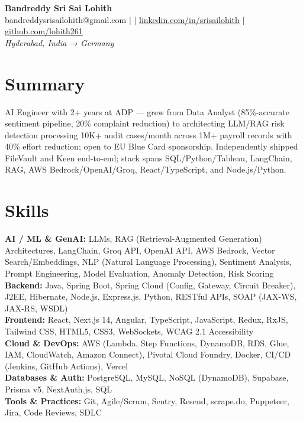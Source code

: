 \documentclass[10pt,letterpaper]{article}
\newcommand{\skillrow}[2]{\textbf{#1:} #2 \\[1pt]}
\begin{document}
\begin{center}
  {\Huge\bfseries Bandreddy Sri Sai Lohith}\\[3pt]
  \small bandreddysrisailohith@gmail.com $\vert$ $\vert$\; \href{https://linkedin.com/in/srisailohith}{linkedin.com/in/srisailohith} $\vert$\; \href{https://github.com/lohith261}{github.com/lohith261} \\[2pt]
  \small\textit{Hyderabad, India → Germany}
\end{center}

\section{Summary}

AI Engineer with 2+ years at ADP --- grew from Data Analyst (85\%-accurate sentiment pipeline, 20\% complaint reduction) to architecting LLM/RAG risk detection processing 10K+ audit cases/month across 1M+ payroll records with 40\% effort reduction; open to EU Blue Card sponsorship.
      Independently shipped FileVault and Keen end-to-end; stack spans SQL/Python/Tableau, LangChain, RAG, AWS Bedrock/OpenAI/Groq, React/TypeScript, and Node.js/Python.

\section{Skills}

\skillrow{AI / ML \& GenAI}{LLMs, RAG (Retrieval-Augmented Generation) Architectures, LangChain, Groq API, OpenAI API, AWS Bedrock, Vector Search/Embeddings, NLP (Natural Language Processing), Sentiment Analysis, Prompt Engineering, Model Evaluation, Anomaly Detection, Risk Scoring}
\skillrow{Backend}{Java, Spring Boot, Spring Cloud (Config, Gateway, Circuit Breaker), J2EE, Hibernate, Node.js, Express.js, Python, RESTful APIs, SOAP (JAX-WS, JAX-RS, WSDL)}
\skillrow{Frontend}{React, Next.js 14, Angular, TypeScript, JavaScript, Redux, RxJS, Tailwind CSS, HTML5, CSS3, WebSockets, WCAG 2.1 Accessibility}
\skillrow{Cloud \& DevOps}{AWS (Lambda, Step Functions, DynamoDB, RDS, Glue, IAM, CloudWatch, Amazon Connect), Pivotal Cloud Foundry, Docker, CI/CD (Jenkins, GitHub Actions), Vercel}
\skillrow{Databases \& Auth}{PostgreSQL, MySQL, NoSQL (DynamoDB), Supabase, Prisma v5, NextAuth.js, SQL}
\skillrow{Tools \& Practices}{Git, Agile/Scrum, Sentry, Resend, scrape.do, Puppeteer, Jira, Code Reviews, SDLC}
\end{document}
